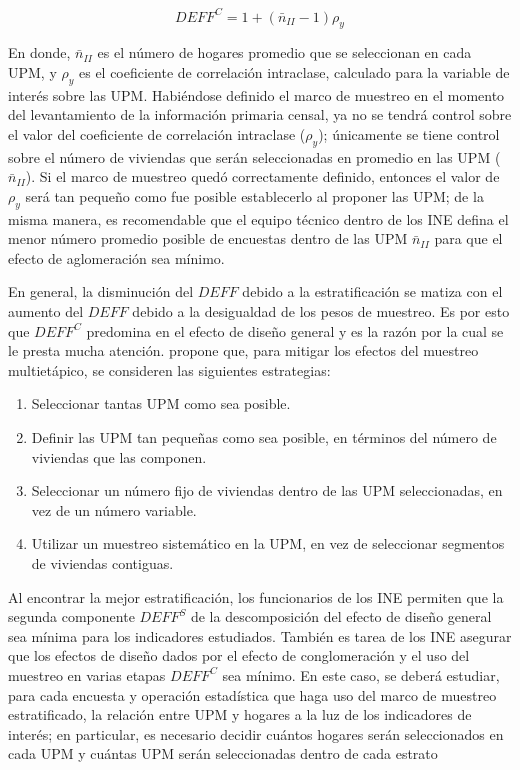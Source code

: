 \documentclass[
  12pt,
  spanish,
]{book}
\providecommand{\tightlist}{%
  \setlength{\itemsep}{0pt}\setlength{\parskip}{0pt}}
\begin{document}
\[
DEFF^C = 1 + (\bar{n}_{II}-1)\rho_y
\]

En donde, \(\bar{n}_{II}\) es el número de hogares promedio que se seleccionan en cada UPM, y \(\rho_y\) es el coeficiente de correlación intraclase, calculado para la variable de interés sobre las UPM. Habiéndose definido el marco de muestreo en el momento del levantamiento de la información primaria censal, ya no se tendrá control sobre el valor del coeficiente de correlación intraclase (\(\rho_y\)); únicamente se tiene control sobre el número de viviendas que serán seleccionadas en promedio en las UPM (\(\bar{n}_{II}\)). Si el marco de muestreo quedó correctamente definido, entonces el valor de \(\rho_y\) será tan pequeño como fue posible establecerlo al proponer las UPM; de la misma manera, es recomendable que el equipo técnico dentro de los INE defina el menor número promedio posible de encuestas dentro de las UPM \(\bar{n}_{II}\) para que el efecto de aglomeración sea mínimo.

En general, la disminución del \(DEFF\) debido a la estratificación se matiza con el aumento del \(DEFF\) debido a la desigualdad de los pesos de muestreo. Es por esto que \(DEFF^C\) predomina en el efecto de diseño general y es la razón por la cual se le presta mucha atención. \citet{United_Nations_2008} propone que, para mitigar los efectos del muestreo multietápico, se consideren las siguientes estrategias:

\begin{enumerate}
\def\labelenumi{\arabic{enumi}.}
\tightlist
\item
  Seleccionar tantas UPM como sea posible.
\item
  Definir las UPM tan pequeñas como sea posible, en términos del número de viviendas que las componen.
\item
  Seleccionar un número fijo de viviendas dentro de las UPM seleccionadas, en vez de un número variable.
\item
  Utilizar un muestreo sistemático en la UPM, en vez de seleccionar segmentos de viviendas contiguas.
\end{enumerate}

Al encontrar la mejor estratificación, los funcionarios de los INE permiten que la segunda componente \(DEFF^S\) de la descomposición del efecto de diseño general sea mínima para los indicadores estudiados. También es tarea de los INE asegurar que los efectos de diseño dados por el efecto de conglomeración y el uso del muestreo en varias etapas \(DEFF^C\) sea mínimo. En este caso, se deberá estudiar, para cada encuesta y operación estadística que haga uso del marco de muestreo estratificado, la relación entre UPM y hogares a la luz de los indicadores de interés; en particular, es necesario decidir cuántos hogares serán seleccionados en cada UPM y cuántas UPM serán seleccionadas dentro de cada estrato
\end{document}
